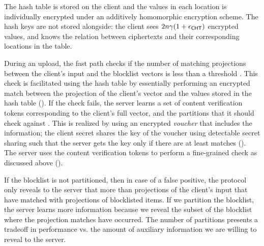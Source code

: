 The hash table is stored on the client and the values in each location is individually encrypted under an additively homomorphic encryption scheme. The hash keys are not stored alongside: the client sees $2 n \gamma(1+\epsilon_{\mathsf{CHT}})$ encrypted values, and knows the relation between ciphertexts and their corresponding locations in the table. 

During an upload, the fast path checks if the number of matching projections between the client's input and the blocklist vectors is less than a threshold \detectionThreshold. This check is facilitated using the hash table by essentially performing an encrypted match between the projection of the client's vector and the values stored in the hash table ().
If the check fails, the server learns a set of content verification tokens corresponding to the client's full vector, and the partitions that it should check against . This is realized by using an encrypted \emph{voucher} that includes the information; the client secret shares the key of the voucher using detectable secret sharing such that the server gets the key only if there are at least \detectionThreshold matches (). The server uses the content verification tokens to perform a fine-grained check as discussed above (). 

\begin{remark}
If the blocklist is not partitioned, then in case of a false positive, the protocol only reveals to the server that more than \detectionThreshold projections of the client's input that have matched with projections of blocklisted items. If we partition the blocklist, the server learns more information because we reveal the subset of the blocklist where the projection matches have occurred. The number of partitions presents a tradeoff in performance vs. the amount of auxiliary information we are willing to reveal to the server. 

\end{remark}


